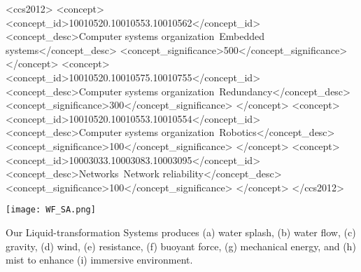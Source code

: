 \documentclass[manuscript]{acmart} %
\begin{document}
\begin{CCSXML}
<ccs2012>
 <concept>
  <concept_id>10010520.10010553.10010562</concept_id>
  <concept_desc>Computer systems organization~Embedded systems</concept_desc>
  <concept_significance>500</concept_significance>
 </concept>
 <concept>
  <concept_id>10010520.10010575.10010755</concept_id>
  <concept_desc>Computer systems organization~Redundancy</concept_desc>
  <concept_significance>300</concept_significance>
 </concept>
 <concept>
  <concept_id>10010520.10010553.10010554</concept_id>
  <concept_desc>Computer systems organization~Robotics</concept_desc>
  <concept_significance>100</concept_significance>
 </concept>
 <concept>
  <concept_id>10003033.10003083.10003095</concept_id>
  <concept_desc>Networks~Network reliability</concept_desc>
  <concept_significance>100</concept_significance>
 </concept>
</ccs2012>
\end{CCSXML}


\begin{teaserfigure}
  \texttt{[image: WF\_SA.png]}
  \vspace{-1.75em}
  \caption{Our Liquid-transformation Systems produces (a) water splash, (b) water flow, (c) gravity, (d) wind,  (e) resistance, (f) buoyant force, (g) mechanical energy, and (h) mist to enhance (i) immersive environment.}
  \vspace{0.5em}
  \Description{}
  \label{fig:teaser}
\end{teaserfigure}

\maketitle
\end{document}
